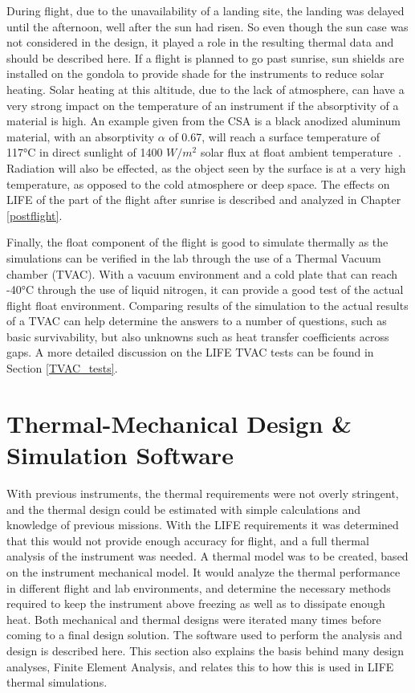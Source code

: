 During flight, due to the unavailability of a landing site, the landing was delayed until the afternoon, well after the sun had risen. So even though the sun case was not considered in the design, it played a role in the resulting thermal data and should be described here. If a flight is planned to go past sunrise, sun shields are installed on the gondola to provide shade for the instruments to reduce solar heating. Solar heating at this altitude, due to the lack of atmosphere, can have a very strong impact on the temperature of an instrument if the absorptivity of a material is high. An example given from the CSA is a black anodized aluminum material, with an absorptivity $\alpha$ of 0.67, will reach a surface temperature of 117°C in direct sunlight of 1400 $W/m^2$ solar flux at float ambient temperature~\citep{STRATOS_CARMENCITA_doc}. Radiation will also be effected, as the object seen by the surface is at a very high temperature, as opposed to the cold atmosphere or deep space. The effects on LIFE of the part of the flight after sunrise is described and analyzed in Chapter \ref{postflight}.

Finally, the float component of the flight is good to simulate thermally as the simulations can be verified in the lab through the use of a Thermal Vacuum chamber (TVAC). With a vacuum environment and a cold plate that can reach -40°C through the use of liquid nitrogen, it can provide a good test of the actual flight float environment. Comparing results of the simulation to the actual results of a TVAC can help determine the answers to a number of questions, such as basic survivability, but also unknowns such as heat transfer coefficients across gaps. A more detailed discussion on the LIFE TVAC tests can be found in Section \ref{TVAC_tests}.

\section{Thermal-Mechanical Design \& Simulation Software}\label{thermal_sim_sw_sec}
With previous instruments, the thermal requirements were not overly stringent, and the thermal design could be estimated with simple calculations and knowledge of previous missions. With the LIFE requirements it was determined that this would not provide enough accuracy for flight, and a full thermal analysis of the instrument was needed. A thermal model was to be created, based on the instrument mechanical model. It would analyze the thermal performance in different flight and lab environments, and determine the necessary methods required to keep the instrument above freezing as well as to dissipate enough heat. Both mechanical and thermal designs were iterated many times before coming to a final design solution. The software used to perform the analysis and design is described here. This section also explains the basis behind many design analyses, Finite Element Analysis, and relates this to how this is used in LIFE thermal simulations.

